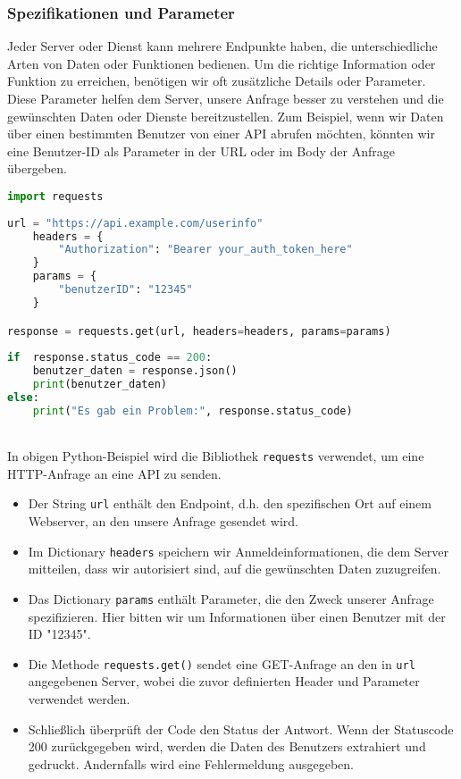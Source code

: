 \documentclass[12pt,a4paper]{article}
\begin{document}
\subsubsection{Spezifikationen und Parameter}
Jeder Server oder Dienst kann mehrere Endpunkte haben, die unterschiedliche Arten von Daten oder Funktionen bedienen. Um die richtige Information oder Funktion zu erreichen, benötigen wir oft zusätzliche Details oder Parameter. Diese Parameter helfen dem Server, unsere Anfrage besser zu verstehen und die gewünschten Daten oder Dienste bereitzustellen.
\newline
\newline
Zum Beispiel, wenn wir Daten über einen bestimmten Benutzer von einer API abrufen möchten, könnten wir eine Benutzer-ID als Parameter in der URL oder im Body der Anfrage übergeben.
\ \\
\begin{lstlisting}[language=Python, numbers = none]
import requests
	
url = "https://api.example.com/userinfo"
	headers = {
		"Authorization": "Bearer your_auth_token_here"
	}
	params = {
		"benutzerID": "12345"
	}

response = requests.get(url, headers=headers, params=params)
	
if  response.status_code == 200:
    benutzer_daten = response.json()
    print(benutzer_daten)
else:
    print("Es gab ein Problem:", response.status_code)
\end{lstlisting}
\ \\
In obigen Python-Beispiel wird die Bibliothek \texttt{requests} verwendet, um eine HTTP-Anfrage an eine API zu senden.
\begin{itemize}
	\item Der String \texttt{url} enthält den Endpoint, d.h. den spezifischen Ort auf einem Webserver, an den unsere Anfrage gesendet wird.
	\item Im Dictionary \texttt{headers} speichern wir Anmeldeinformationen, die dem Server mitteilen, dass wir autorisiert sind, auf die gewünschten Daten zuzugreifen.
	\item Das Dictionary \texttt{params} enthält Parameter, die den Zweck unserer Anfrage spezifizieren. Hier bitten wir um Informationen über einen Benutzer mit der ID "12345".
	\item Die Methode \texttt{requests.get()} sendet eine GET-Anfrage an den in \texttt{url} angegebenen Server, wobei die zuvor definierten Header und Parameter verwendet werden.
	\item Schließlich überprüft der Code den Status der Antwort. Wenn der Statuscode 200  zurückgegeben wird, werden die Daten des Benutzers extrahiert und gedruckt. Andernfalls wird eine Fehlermeldung ausgegeben.
\end{itemize}
\end{document}

